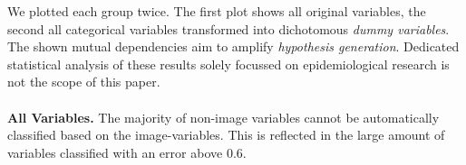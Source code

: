 \documentclass[a4paper,twoside]{style/article}
\begin{document}
We plotted each group twice.
The first plot shows all original variables, the second all categorical variables transformed into dichotomous \emph{dummy variables}.
The shown mutual dependencies aim to amplify \emph{hypothesis generation}.
Dedicated statistical analysis of these results solely focussed on epidemiological research is not the scope of this paper.
\\\\
\noindent \textbf{All Variables.}
The majority of non-image variables cannot be automatically classified based on the image-variables.
This is reflected in the large amount of variables classified with an error above $0.6$.
\end{document}
